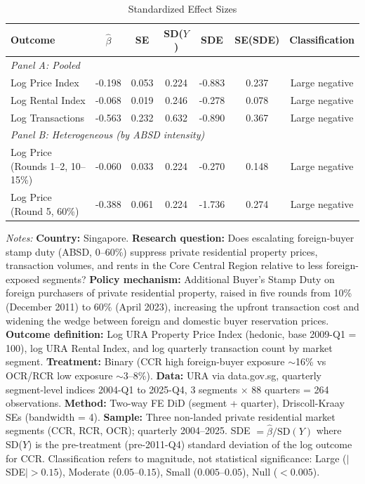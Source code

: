 \begin{table}[htbp]
\centering
\caption{Standardized Effect Sizes}\label{tab:sde}
\begin{threeparttable}
\small
\begin{tabular}{lcccccc}
\toprule
Outcome & $\hat{\beta}$ & SE & SD($Y$) & SDE & SE(SDE) & Classification \\
\midrule
\multicolumn{7}{l}{\textit{Panel A: Pooled}} \\
Log Price Index & -0.198 & 0.053 & 0.224 & -0.883 & 0.237 & Large negative \\
Log Rental Index & -0.068 & 0.019 & 0.246 & -0.278 & 0.078 & Large negative \\
Log Transactions & -0.563 & 0.232 & 0.632 & -0.890 & 0.367 & Large negative \\
\midrule
\multicolumn{7}{l}{\textit{Panel B: Heterogeneous (by ABSD intensity)}} \\
Log Price (Rounds 1--2, 10--15\%) & -0.060 & 0.033 & 0.224 & -0.270 & 0.148 & Large negative \\
Log Price (Round 5, 60\%) & -0.388 & 0.061 & 0.224 & -1.736 & 0.274 & Large negative \\
\bottomrule
\end{tabular}
\begin{tablenotes}[flushleft]\small
\item \textit{Notes:} \textbf{Country:} Singapore. \textbf{Research question:} Does escalating foreign-buyer stamp duty (ABSD, 0--60\%) suppress private residential property prices, transaction volumes, and rents in the Core Central Region relative to less foreign-exposed segments? \textbf{Policy mechanism:} Additional Buyer's Stamp Duty on foreign purchasers of private residential property, raised in five rounds from 10\% (December 2011) to 60\% (April 2023), increasing the upfront transaction cost and widening the wedge between foreign and domestic buyer reservation prices. \textbf{Outcome definition:} Log URA Property Price Index (hedonic, base 2009-Q1 = 100), log URA Rental Index, and log quarterly transaction count by market segment. \textbf{Treatment:} Binary (CCR high foreign-buyer exposure $\sim$16\% vs OCR/RCR low exposure $\sim$3--8\%). \textbf{Data:} URA via data.gov.sg, quarterly segment-level indices 2004-Q1 to 2025-Q4, 3 segments $\times$ 88 quarters = 264 observations. \textbf{Method:} Two-way FE DiD (segment + quarter), Driscoll-Kraay SEs (bandwidth = 4). \textbf{Sample:} Three non-landed private residential market segments (CCR, RCR, OCR); quarterly 2004--2025. SDE $= \hat{\beta} / \text{SD}(Y)$ where SD($Y$) is the pre-treatment (pre-2011-Q4) standard deviation of the log outcome for CCR. Classification refers to magnitude, not statistical significance: Large ($|$SDE$| > 0.15$), Moderate ($0.05$--$0.15$), Small ($0.005$--$0.05$), Null ($< 0.005$).
\end{tablenotes}
\end{threeparttable}
\end{table}

